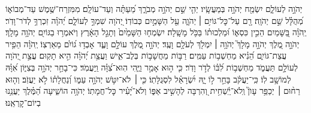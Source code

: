 \documentclass[twoside, openany, parskip=half, 11pt]{book}
\begin{document}
\label{yehikvod}
יְהֹוָ֣ה לְעוֹלָ֑ם יִשְׂמַ֖ח יְהֹוָ֣ה בְּמַעֲשָֽׂיו׃   \hfill \break
{}יְהִ֤י שֵׁ֣ם יְהֹוָ֣ה מְבֹרָ֑ךְ מֵ֝עַתָּ֗ה וְעַד־עוֹלָֽם׃  \hfill \break
מִמִּזְרַח־שֶׁ֥מֶשׁ עַד־מְבוֹא֑וֹ מְ֝הֻלָּ֗ל שֵׁ֣ם יְהֹוָֽה׃  \hfill \break
רָ֖ם עַל־כׇּל־גּוֹיִ֥ם ׀ יְהֹוָ֑ה עַ֖ל הַשָּׁמַ֣יִם כְּבוֹדֽוֹ׃  \hfill \break
{} יְ֭הֹוָה שִׁמְךָ֣ לְעוֹלָ֑ם יְ֝הֹוָ֗ה זִכְרְךָ֥ לְדֹר־וָדֹֽר׃   \hfill \break
{} יְֽהֹוָ֗ה בַּ֭שָּׁמַיִם הֵכִ֣ין כִּסְא֑וֹ וּ֝מַלְכוּת֗וֹ בַּכֹּ֥ל מָשָֽׁלָה׃   \hfill \break
{} יִשְׂמְח֤וּ הַשָּׁמַ֙יִם֙ וְתָגֵ֣ל הָאָ֔רֶץ וְיֹאמְר֥וּ בַגּוֹיִ֖ם יְהֹוָ֥ה מָלָֽךְ׃  \hfill \break
{} יְהֹוָ֣ה מֶ֭לֶךְ 
יְהֹוָ֣ה מָלָךְ֮
 יְהֹוָ֥ה ׀ יִמְלֹ֖ךְ לְעֹלָ֥ם וָעֶֽד׃  \hfill \break
{} יְהֹוָ֣ה מֶ֭לֶךְ עוֹלָ֣ם וָעֶ֑ד אָבְד֥וּ ג֝וֹיִ֗ם מֵאַרְצֽוֹ׃  \hfill \break
{} יְֽהֹוָ֗ה הֵפִ֥יר עֲצַת־גּוֹיִ֑ם הֵ֝נִ֗יא מַחְשְׁב֥וֹת עַמִּֽים׃   \hfill \break
{}רַבּ֣וֹת מַחֲשָׁב֣וֹת בְּלֶב־אִ֑ישׁ וַעֲצַ֥ת יְ֝הֹוָ֗ה הִ֣יא תָקֽוּם׃   \hfill \break
{}עֲצַ֣ת יְ֭הֹוָה לְעוֹלָ֣ם תַּעֲמֹ֑ד מַחְשְׁב֥וֹת לִ֝בּ֗וֹ לְדֹ֣ר וָדֹֽר׃   \hfill \break
כִּ֤י ה֣וּא אָמַ֣ר וַיֶּ֑הִי הֽוּא־צִ֝וָּ֗ה וַֽיַּעֲמֹֽד׃  \hfill \break
{}כִּי־בָחַ֣ר יְהֹוָ֣ה בְּצִיּ֑וֹן אִ֝וָּ֗הּ לְמוֹשָׁ֥ב לֽוֹ׃   \hfill \break
{}כִּֽי־יַעֲקֹ֗ב בָּחַ֣ר ל֣וֹ יָ֑הּ יִ֝שְׂרָאֵ֗ל לִסְגֻלָּתֽוֹ׃   \hfill \break
{}כִּ֤י ׀ לֹא־יִטֹּ֣שׁ יְהֹוָ֣ה עַמּ֑וֹ וְ֝נַחֲלָת֗וֹ לֹ֣א יַעֲזֹֽב׃   \hfill \break
{}וְה֤וּא רַח֨וּם ׀ יְכַפֵּ֥ר עָוֺן֮ וְֽלֹא־יַֽ֫שְׁחִ֥ית וְ֭הִרְבָּה לְהָשִׁ֣יב אַפּ֑וֹ  \hfill \break
וְלֹא־יָ֝עִ֗יר כׇּל־חֲמָתֽוֹ׃   \hfill \break
{} יְהֹוָ֥ה הוֹשִׁ֑יעָה הַ֝מֶּ֗לֶךְ יַעֲנֵ֥נוּ בְיוֹם־קׇרְאֵֽנוּ׃  \hfill \break
\end{document}
